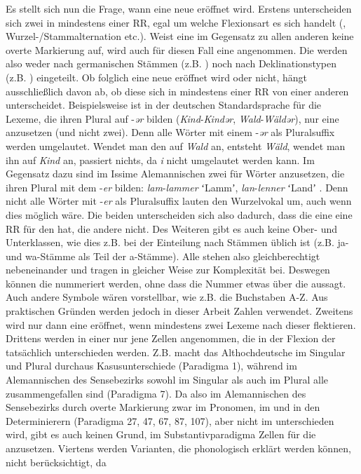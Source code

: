 Es stellt sich nun die Frage, wann eine neue  eröffnet wird. Erstens unterscheiden sich zwei  in mindestens einer RR, egal um welche Flexionsart es sich handelt (, Wur\-zel-/Stamm\-al\-ter\-na\-tion etc.). Weist eine  im Gegensatz zu allen anderen  keine overte Markierung auf, wird auch für diesen Fall eine  angenommen. Die  werden also weder nach germanischen Stämmen (z.B. \citealt{Braune2004}) noch nach Deklinationstypen (z.B. \citealt{EisenbergGelhausHenneSittaWellmann1998}) eingeteilt. Ob folglich eine neue  eröffnet wird oder nicht, hängt ausschließlich davon ab, ob diese sich in mindestens einer RR von einer anderen unterscheidet. Beispielsweise ist in der deutschen Standardsprache für die Lexeme, die ihren Plural auf -\textit{ər} bilden (\textit{Kind}{}-\textit{Kindər}, \textit{Wald}{}-\textit{Wäldər}), nur eine  anzusetzen (und nicht zwei). Denn alle Wörter mit einem -\textit{ər} als Pluralsuffix werden umgelautet. Wendet man den  auf \textit{Wald} an, entsteht \textit{Wäld}, wendet man ihn auf \textit{Kind} an, passiert nichts, da \textit{i} nicht umgelautet werden kann. Im Gegensatz dazu sind im Issime Alemannischen zwei  für Wörter anzusetzen, die ihren Plural mit dem  -\textit{er} bilden: \textit{l}{\textit{a}}\textit{m}-\textit{l}{\textit{a}}\textit{mmer} ʻLammʼ, \textit{l}{\textit{a}}\textit{n}-\textit{l}{\textit{e}}\textit{nner} ʻLandʼ \citep[164]{Zürrer1999}. Denn nicht alle Wörter mit -\textit{er} als Pluralsuffix lauten den Wurzelvokal um, auch wenn dies möglich wäre. Die beiden  unterscheiden sich also dadurch, dass die eine eine RR für den  hat, die andere nicht. Des Weiteren gibt es auch keine Ober- und Unterklassen, wie dies z.B. bei der Einteilung nach Stämmen üblich ist (z.B. ja- und wa-Stäm\-me als Teil der a-Stäm\-me). Alle  stehen also gleichberechtigt nebeneinander und tragen in gleicher Weise zur Komplexität bei. Deswegen können die  nummeriert werden, ohne dass die Nummer etwas über die  aussagt. Auch andere Symbole wären vorstellbar, wie z.B. die Buchstaben A-Z. Aus praktischen Gründen werden jedoch in dieser Arbeit Zahlen verwendet. Zweitens wird nur dann eine  eröffnet, wenn mindestens zwei Lexeme nach dieser  flektieren. Drittens werden in einer  nur jene Zellen angenommen, die in der Flexion der  tatsächlich unterschieden werden. Z.B. macht das Althochdeutsche im Singular und Plural durchaus Kasusunterschiede (Paradigma 1), während im Alemannischen des Sensebezirks sowohl im Singular als auch im Plural alle  zusammengefallen sind (Paradigma 7). Da also im Alemannischen des Sensebezirks  durch overte Markierung zwar im Pronomen, im  und in den Determinierern (Paradigma 27, 47, 67, 87, 107), aber nicht im  unterschieden wird, gibt es auch keinen Grund, im Substantivparadigma Zellen für die  anzusetzen. Viertens werden Varianten, die phonologisch erklärt werden können, nicht berücksichtigt, da 